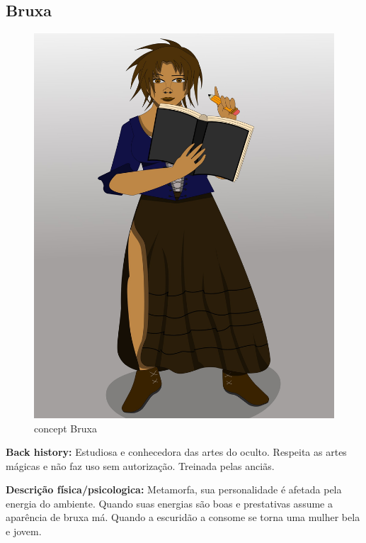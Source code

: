 \subsection{Bruxa}

\begin{figure}[htb]
	\caption{concept Bruxa}
	\begin{center}
	    \includegraphics[width=\textwidth/2]{imagens/capaportifolio.jpeg}
	\end{center}
\end{figure}


\textbf{Back history:} Estudiosa e conhecedora das artes do oculto. Respeita as artes mágicas e não faz uso sem autorização. Treinada pelas anciãs.

\textbf{Descrição física/psicologica:} Metamorfa, sua personalidade é afetada pela energia do ambiente. Quando suas energias são boas e prestativas assume a aparência de bruxa má. Quando a escuridão a consome se torna uma mulher bela e jovem.

